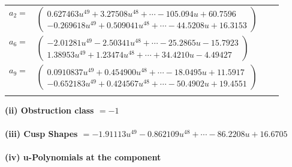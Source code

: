 \documentclass[1p]{elsarticle_modified}
\theoremstyle{definition}
\begin{document}
\begin{tabular}{m{7pt} m{180pt} m{7pt} m{180pt} }
\flushright $a_{2}=$&$\begin{pmatrix}0.627463 u^{49}+3.27508 u^{48}+\cdots-105.094 u+60.7596\\-0.269618 u^{49}+0.509041 u^{48}+\cdots-44.5208 u+16.3153\end{pmatrix}$ \\
\flushright $a_{6}=$&$\begin{pmatrix}-2.01281 u^{49}-2.50341 u^{48}+\cdots-25.2865 u-15.7923\\1.38953 u^{49}+1.23474 u^{48}+\cdots+34.4210 u-4.49427\end{pmatrix}$ \\
\flushright $a_{9}=$&$\begin{pmatrix}0.0910837 u^{49}+0.454900 u^{48}+\cdots-18.0495 u+11.5917\\-0.652183 u^{49}+0.424567 u^{48}+\cdots-50.4902 u+19.4551\end{pmatrix}$\\&\end{tabular}
\flushleft \textbf{(ii) Obstruction class $= -1$}\\~\\
\flushleft \textbf{(iii) Cusp Shapes $= -1.91113 u^{49}-0.862109 u^{48}+\cdots-86.2208 u+16.6705$}\\~\\
\newpage\renewcommand{\arraystretch}{1}
\flushleft \textbf{(iv) u-Polynomials at the component}\newline \\
\end{document}
